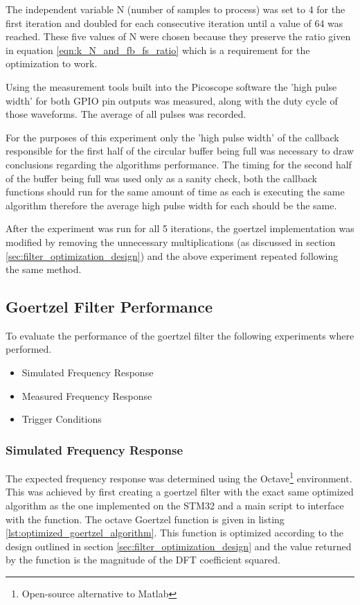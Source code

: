 The independent variable N (number of samples to process) was set to 4 for the first iteration and doubled for each consecutive iteration until a value of 64 was reached. These five values of N were chosen because they preserve the ratio given in equation \ref{eqn:k_N_and_fb_fs_ratio} which is a requirement for the optimization to work.

Using the measurement tools built into the Picoscope software the 'high pulse width' for both GPIO pin outputs was measured, along with the duty cycle of those waveforms. The average of all pulses was recorded.

For the purposes of this experiment only the 'high pulse width' of the callback responsible for the first half of the circular buffer being full was necessary to draw conclusions regarding the algorithms performance. The timing for the second half of the buffer being full was used only as a sanity check, both the callback functions should run for the same amount of time as each is executing the same algorithm therefore the average high pulse width for each should be the same.

After the experiment was run for all 5 iterations, the goertzel implementation was modified by removing the unnecessary multiplications (as discussed in section \ref{sec:filter_optimization_design}) and the above experiment repeated following the same method.




\subsection{Goertzel Filter Performance}

To evaluate the performance of the goertzel filter the following experiments where performed.

\begin{itemize}
	\item Simulated Frequency Response
	\item Measured Frequency Response
	\item Trigger Conditions
\end{itemize}

\subsubsection{Simulated Frequency Response}
The expected frequency response was determined using the Octave\footnote{Open-source alternative to Matlab} environment. This was achieved by first creating a goertzel filter with the exact same optimized algorithm as the one implemented on the STM32 and a main script to interface with the function. The octave Goertzel function is given in listing \ref{lst:optimized_goertzel_algorithm}. This function is optimized according to the design outlined in section \ref{sec:filter_optimization_design} and the value returned by the function is the magnitude of the DFT coefficient squared.

